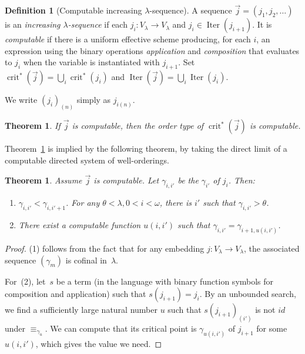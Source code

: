 \documentclass{article}
\newtheorem{theorem}[lemma]{Theorem}
\theoremstyle{definition}
\newtheorem{definition}[lemma]{Definition}
\theoremstyle{remark}
\DeclareMathOperator{\crit}{crit}
\DeclareMathOperator{\Iter}{Iter}
\begin{document}
\begin{definition}[Computable increasing $\lambda$-sequence]\label{def:inc-seq}
A sequence $\vec{j}=(j_1,j_2,\ldots)$ is an \emph{increasing $\lambda$-sequence} if each $j_i:V_\lambda\to V_\lambda$ and $j_i\in \Iter(j_{i+1})$.
It is \emph{computable} if there is a uniform effective scheme producing, for each $i$, an expression using the binary operations \emph{application} and \emph{composition} that evaluates to $j_i$ when the variable is instantiated with $j_{i+1}$.
Set $\crit^*(\vec{j})=\bigcup_i \crit^*(j_i)$ and $\Iter(\vec{j})=\bigcup_i \Iter(j_i)$.
\end{definition}

We write $(j_i)_{(n)}$ simply as $j_{i(n)}$.

\begin{theorem}\label{thm:critstar-computable}
If $\vec{j}$ is computable, then the order type of $\crit^*(\vec{j})$ is computable.
\end{theorem}

Theorem~\ref{thm:critstar-computable} is implied by the following theorem, by taking the direct limit of a computable directed system of well-orderings. 

\begin{theorem}
    Assume $\vec{j}$ is computable. Let $\gamma_{i,i'}$ be the $\gamma_{i'}$ of $j_i$. Then:

    \begin{enumerate}
      \item $\gamma_{i,i'}<\gamma_{i,i'+1}$. For any $\theta<\lambda, 0<i<\omega$, there is $i'$ such that $\gamma_{i,i'}>\theta$.

      \item  There exist a computable function $u(i,i')$ such that $\gamma_{i,i'}=\gamma_{i+1,u(i,i')}$.
    \end{enumerate}
\end{theorem}

\begin{proof}
  (1) follows from the fact that for any embedding $j\colon V_\lambda\to V_\lambda$, the associated sequence $(\gamma_m)$ is cofinal in~$\lambda$. 

  For~(2), let~$s$ be a term (in the language with binary function symbols for composition and application) such that $s(j_{i+1})=j_i$. By an unbounded search, we find a sufficiently large natural number $u$ such that $s(j_{i+1})_{(i')}$ is not $id$ under $\equiv_{\gamma_u}$. We can compute that its critical point is $\gamma_{u(i,i')}$ of $j_{i+1}$ for some $u(i,i')$, which gives the value we need.
\end{proof}
\end{document}
